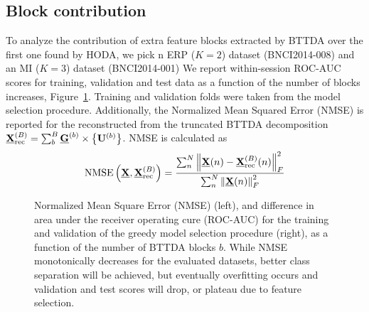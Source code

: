 \documentclass[twocolumn]{article}
\begin{document}
\subsection{Block contribution}
To analyze the contribution of extra feature blocks extracted by {BTTDA} over
the first one found by \textsc{HODA}, we pick n ERP ($K=2$) dataset
(BNCI2014-008) and an MI ($K=3$) dataset (BNCI2014-001)
We report within-session ROC-AUC scores for training, validation and test data as a function
of the number of blocks increases, Figure~\ref{fig:blocks}.
Training and validation folds were taken from the model selection procedure.
Additionally, the Normalized Mean Squared Error (NMSE) is reported for the
reconstructed from the truncated \textsc{BTTDA} decomposition
$\textstyle{\underline{\mathbf{X}}_\text{rec}^{(B)}=\sum_b^B\underline{\mathbf{G}}^{(b)}\times\left\{\mathbf{U}^{(b)}\right\}}$.
NMSE is calculated as
\begin{equation}
	\operatorname{NMSE}\left(\underline{\mathbf{X}}, \underline{\mathbf{X}}_\text{rec}^{(B)}\right) =
	\frac{\sum_n^N\left\lVert\underline{\mathbf{X}}(n)-\underline{\mathbf{X}}_\text{rec}^{(B)}(n)\right\rVert_F^2}
	{\sum_n^N\left\lVert\underline{\mathbf{X}}(n)\right\rVert_F^2}
\end{equation}
\begin{figure}[t]
	
	\caption{Normalized Mean Square Error (NMSE) (left), and difference in area
		under the receiver operating cure (ROC-AUC) for the training and validation
		of the greedy model selection procedure (right), as a function of the number of BTTDA blocks $b$.
		While NMSE monotonically decreases for the evaluated datasets, better class
		separation will be achieved, but eventually overfitting occurs and validation
		and test scores will drop, or plateau due to feature selection.
	}
	\label{fig:blocks}
\end{figure}
\end{document}
